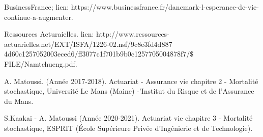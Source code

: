 \documentclass[]{./tpl/isipfe}
\begin{document}
\dominitoc
    
    
    \frontmatter
        
       
        
        
       
        \thispagestyle{frontmatter}
        
       \setcounter{secnumdepth}{3}
        \setcounter{tocdepth}{2}
        \dominitoc
        \tableofcontents
        \adjustmtc
        \thispagestyle{frontmatter}
        
        \listoffigures
        \thispagestyle{frontmatter}
        \thispagestyle{frontmatter}
        
        
        \thispagestyle{frontmatter}
    
    \mainmatter
        
        \clearpage
        \dominitoc
        \setcounter{minitocdepth}{9}
        
        
        
        \clearpage
        
        
        \clearpage
        
        
        \clearpage
       
        
	
\begin{thebibliography}{100}
 BusinessFrance; lien: https://www.businessfrance.fr/danemark-l-esperance-de-vie-continue-a-augmenter.

 Ressources Acturaielles. lien: http://www.ressources-actuarielles.net/EXT/ISFA/1226-02.nsf/9c8e3fd4d887\\4d60c1257052003eced6/ff3077c1f701b9b0c1257705004878f7/$\$$FILE/Namtchueng.pdf.

 A. Matoussi. (Année 2017-2018). Actuariat - Assurance vie chapitre 2 - Mortalité stochastique,
Université Le Mans (Maine) -’Institut du Risque et de l’Assurance du Mans.

 S.Kaakai - A. Matoussi (Année 2020-2021). Actuariat vie chapitre 3 - Mortalité stochastique,
ESPRIT (École Supérieure Privée d'Ingénierie et de Technologie).
\end{thebibliography} 

    
    
\end{document}
